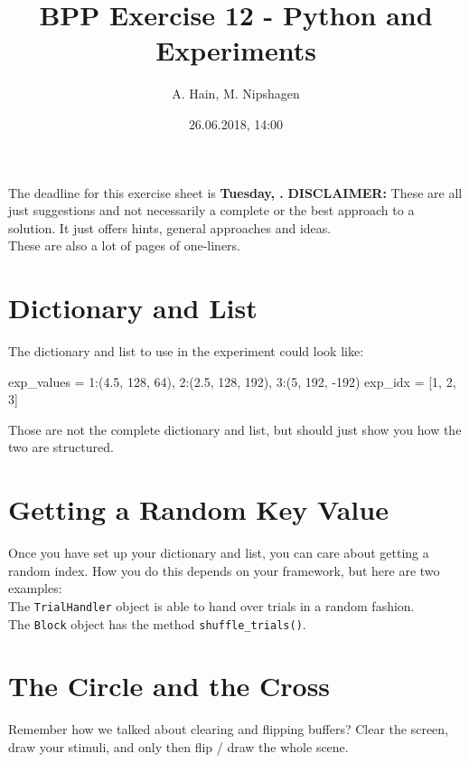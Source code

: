 

\title{BPP Exercise 12 - Python and Experiments}
\author{A. Hain, M. Nipshagen}
\date{26.06.2018, 14:00}

\makeatletter
\let\thetitle\@title
\let\theauthor\@author
\let\thedate\@date
\makeatother

\newcommand\itemsub[1]{
	\begin{itemize}
		\item #1
	\end{itemize}
}

\setcounter{secnumdepth}{0}


The deadline for this exercise sheet is \textbf{Tuesday, \thedate.}
\tableofcontents
\vspace{12pt}\noindent
\textbf{DISCLAIMER:} These are all just suggestions and not necessarily a complete
or the best approach to a solution. It just offers hints, general approaches
and ideas.\\
These are also a lot of pages of one-liners.
\pagebreak

\section{Dictionary and List}
The dictionary and list to use in the experiment could look like:
\begin{python}
exp_values = {1:(4.5, 128, 64), 2:(2.5, 128, 192), 3:(5, 192, -192)}
exp_idx = [1, 2, 3]
\end{python}
Those are not the complete dictionary and list, but should just show
you how the two are structured.

\pagebreak

\section{Getting a Random Key Value}
Once you have set up your dictionary and list, you can care about getting a random index.
How you do this depends on your framework, but here are two examples:\\
The \texttt{TrialHandler} object is able to hand over trials in a random fashion.\\
The \texttt{Block} object has the method \texttt{shuffle\_trials()}.

\pagebreak

\section{The Circle and the Cross}
Remember how we talked about clearing and flipping buffers? Clear the screen,
draw your stimuli, and only then flip / draw the whole scene.

